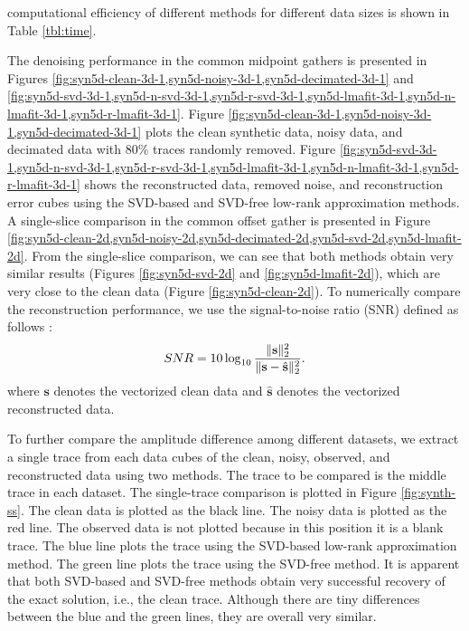 computational efficiency of different methods for different data sizes is shown in Table \ref{tbl:time}.

The denoising performance in the common midpoint gathers is presented in Figures \ref{fig:syn5d-clean-3d-1,syn5d-noisy-3d-1,syn5d-decimated-3d-1} and \ref{fig:syn5d-svd-3d-1,syn5d-n-svd-3d-1,syn5d-r-svd-3d-1,syn5d-lmafit-3d-1,syn5d-n-lmafit-3d-1,syn5d-r-lmafit-3d-1}. Figure \ref{fig:syn5d-clean-3d-1,syn5d-noisy-3d-1,syn5d-decimated-3d-1} plots the clean synthetic data, noisy data, and decimated data with 80\% traces randomly removed. Figure \ref{fig:syn5d-svd-3d-1,syn5d-n-svd-3d-1,syn5d-r-svd-3d-1,syn5d-lmafit-3d-1,syn5d-n-lmafit-3d-1,syn5d-r-lmafit-3d-1} shows the reconstructed data, removed noise, and reconstruction error cubes using the SVD-based and SVD-free low-rank approximation methods. A single-slice comparison in the common offset gather is presented in Figure \ref{fig:syn5d-clean-2d,syn5d-noisy-2d,syn5d-decimated-2d,syn5d-svd-2d,syn5d-lmafit-2d}. From the single-slice comparison, we can see that both methods obtain very similar results (Figures \ref{fig:syn5d-svd-2d} and \ref{fig:syn5d-lmafit-2d}), which are very close to the clean data (Figure \ref{fig:syn5d-clean-2d}). To numerically compare the reconstruction performance, we use the signal-to-noise ratio (SNR) defined as follows \cite{weilin2016,weilin2017gji}:
\begin{equation}
\label{eq:dsnr}
SNR=10\log_{10}\frac{\Arrowvert \mathbf{s} \Arrowvert_2^2}{\Arrowvert \mathbf{s} -\hat{\mathbf{s}}\Arrowvert_2^2}.
\end{equation}
where $\mathbf{s}$ denotes the vectorized clean data and $\hat{\mathbf{s}}$ denotes the vectorized reconstructed data. 

To further compare the amplitude difference among different datasets, we extract a single trace from each data cubes of the clean, noisy, observed, and reconstructed data using two methods. The trace to be compared is the middle trace in each dataset. The single-trace comparison is plotted in Figure \ref{fig:synth-ss}. The clean data is plotted as the black line. The noisy data is plotted as the red line. The observed data is not plotted because in this position it is a blank trace. The blue line plots the trace using the SVD-based low-rank approximation method. The green line plots the trace using the SVD-free method. It is apparent that both SVD-based and SVD-free methods obtain very successful recovery of the exact solution, i.e., the clean trace. Although there are tiny differences between the blue and the green lines, they are overall very similar. 


